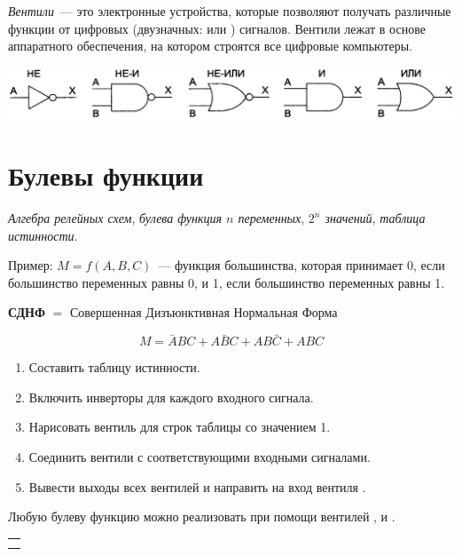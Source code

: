 \emph{Вентили}~--- это электронные устройства, которые позволяют получать различные функции от цифровых (двузначных:  или ) сигналов. Вентили лежат в основе аппаратного обеспечения, на котором строятся все цифровые компьютеры.

\begin{center}
  \includegraphics[width=0.8\columnwidth]{images/gates.png}
\end{center}



\section{Булевы функции}
\emph{Алгебра релейных схем}, \emph{булева функция \(n\) переменных}, \emph{\(2^n\) значений}, \emph{таблица истинности}.

Пример: \(M = f(A,B,C)\)~--- функция большинства, которая принимает 0, если большинство переменных равны 0, и 1, если большинство переменных равны 1.

\begin{center}
\textbf{СДНФ} \(=\) Совершенная Дизъюнктивная Нормальная Форма
\end{center}
\[
  M = \bar ABC + A\bar BC + AB\bar C + ABC
\]

\begin{enumerate}
\item Составить таблицу истинности.
\item Включить инверторы для каждого входного сигнала.
\item Нарисовать вентиль  для строк таблицы со значением 1.
\item Соединить вентили  с соответствующими входными сигналами.
\item Вывести выходы всех вентилей  и направить на вход вентиля .
\end{enumerate}

\medskip
Любую булеву функцию можно реализовать при помощи вентилей ,  и .



\WhatToReadSection
\begin{tabular}{@{}l@{}}
  \citeauthor[глава~1, стр.~2--23, 50--106]{Harris:2015:ru} \\
  \citeauthor[глава~1, стр.~20--26; глава~3, стр.~172--182]{Tanenbaum:2013:ru}
\end{tabular}



